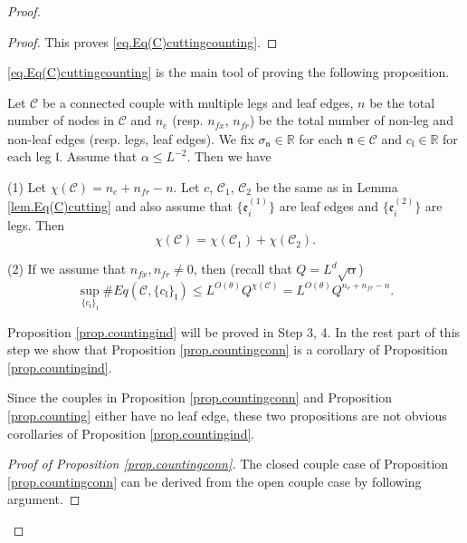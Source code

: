 \begin{proof}
\begin{proof}
This proves \eqref{eq.Eq(C)cuttingcounting}.
\end{proof}

\eqref{eq.Eq(C)cuttingcounting} is the main tool of proving the following proposition.

\begin{lem}\label{lem.eulerchar}
Let $\mathcal{C}$ be a connected couple with multiple legs and leaf edges, $n$ be the total number of nodes in $\mathcal{C}$ and $n_e$ (resp. $n_{\textit{fx}}$, $n_{\textit{fr}}$) be the total number of non-leg and non-leaf edges (resp. legs, leaf edges). We fix $\sigma_{\mathfrak{n}}\in\mathbb{R}$ for each $\mathfrak{n}\in \mathcal{C}$ and $c_{\mathfrak{l}}\in \mathbb{R}$ for each leg $\mathfrak{l}$. Assume that $\alpha\le L^{-2}$. Then we have

(1) Let $\chi(\mathcal{C})=n_e+n_{\textit{fr}}-n$. Let $c$, $\mathcal{C}_1$, $\mathcal{C}_2$ be the same as in Lemma \ref{lem.Eq(C)cutting} and also assume that $\{\mathfrak{e}_{i}^{(1)}\}$ are leaf edges and $\{\mathfrak{e}_{i}^{(2)}\}$ are legs. Then 
\begin{equation}
    \chi(\mathcal{C})=\chi(\mathcal{C}_1)+\chi(\mathcal{C}_2).
\end{equation}

(2) If we assume that $n_{\textit{fx}},n_{\textit{fr}}\ne 0$, then (recall that $Q=L^{d}\sqrt{\alpha}$)
\begin{equation}\label{eq.countingbd3}
\sup_{\{c_{\mathfrak{l}}\}_{\mathfrak{l}}}\#Eq(\mathcal{C},\{c_{\mathfrak{l}}\}_{\mathfrak{l}})\leq L^{O(\theta)} Q^{\chi(\mathcal{C})} = L^{O(\theta)} Q^{n_e+n_{\textit{fr}}-n}.
\end{equation}

\end{lem}

Proposition \ref{prop.countingind} will be proved in Step 3, 4. In the rest part of this step we show that Proposition \ref{prop.countingconn} is a corollary of Proposition \ref{prop.countingind}.

Since the couples in Proposition \ref{prop.countingconn} and Proposition \ref{prop.counting} either have no leaf edge, these two propositions are not obvious corollaries of Proposition \ref{prop.countingind}.

\begin{proof}[Proof of Proposition \ref{prop.countingconn}]
The closed couple case of Proposition  \ref{prop.countingconn} can be derived from the open couple case by following argument.


\end{proof}
\end{proof}
